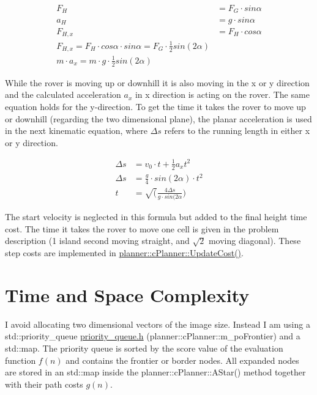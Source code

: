\begin{eqnarray*} F_H &= F_G \cdot sin\alpha \\ a_H &= g \cdot sin\alpha \\ F_{H,x} &= F_H \cdot cos\alpha \\ F_{H,x} = F_H \cdot cos\alpha \cdot sin\alpha = F_G \cdot \frac{1}{2} sin(2\alpha) \\ m \cdot a_x = m \cdot g \cdot \frac{1}{2} sin(2\alpha) \end{eqnarray*}

While the rover is moving up or downhill it is also moving in the x or y direction and the calculated acceleration $a_x$ in x direction is acting on the rover. The same equation holds for the y-\/direction. To get the time it takes the rover to move up or downhill (regarding the two dimensional plane), the planar acceleration is used in the next kinematic equation, where $\Delta s$ refers to the running length in either x or y direction.

\begin{eqnarray*} \Delta s &= v_0 \cdot t + \frac{1}{2} a_x t^2 \\ \Delta s &= \frac{g}{4} \cdot sin(2\alpha) \cdot t^2 \\ t &= \sqrt(\frac{4 \Delta s}{g \cdot sin(2\alpha}) \end{eqnarray*}

The start velocity is neglected in this formula but added to the final height time cost. The time it takes the rover to move one cell is given in the problem description (1 island second moving straight, and $\sqrt 2$ moving diagonal). These step costs are implemented in \mbox{\hyperlink{classplanner_1_1c_planner_a82e45fc2701e90d3fa9df72f475e455e}{planner\+::c\+Planner\+::\+Update\+Cost()}}.

\section*{Time and Space Complexity}

I avoid allocating two dimensional vectors of the image size. Instead I am using a std\+::priority\+\_\+queue \mbox{\hyperlink{priority__queue_8h_source}{priority\+\_\+queue.\+h}} (planner\+::c\+Planner\+::m\+\_\+po\+Frontier) and a std\+::map. The priority queue is sorted by the score value of the evaluation function $f(n)$ and contains the frontier or border nodes. All expanded nodes are stored in an std\+::map inside the planner\+::c\+Planner\+::\+A\+Star() method together with their path costs $g(n)$.

